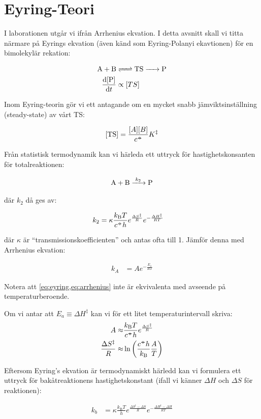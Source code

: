 \section{Eyring-Teori}
\label{sec:eyring}
I laborationen utgår vi ifrån Arrhenius ekvation. I detta avsnitt
skall vi titta närmare på Eyrings ekvation (även känd som Eyring-Polanyi ekavtionen)
för en bimolekylär rekation:

\begin{align}
  \label{eq:ts}
  \ce{A + B} & \ce{<=> TS -> P} \\
  \label{eq:dpdt-propto}
  \frac{\mathrm{d}[\ce{P}]}{\mathrm{d}t} &\propto [TS]
\end{align}

Inom Eyring-teorin gör vi ett antagande om en mycket snabb
jämviktsinställning (steady-state) av vårt TS:

\begin{equation}
  \label{eq:ts-conc}
  [\ce{TS}] = \frac{[A][B]}{c^\plimsoll}K^\ddagger
\end{equation}

Från statistisk termodynamik kan vi härleda ett uttryck för
hastighetskonsanten för totalreaktionen:

\begin{align}
  \ce{A + B ->[k_2] P}
\end{align}

där $k_2$ då ges av:

\begin{align}
  \label{eq:eyring}
  k_2 &= \kappa \frac{k_\mathrm{B} T}{c^{-\kern-5pt{\circ}\kern-5pt-} h} e^{\frac{\Delta S^\ddagger}{R}} e^{-\frac{\Delta H^\ddagger}{RT}}
\end{align}

där $\kappa$ är ``transmissionskoefficienten'' och antas ofta till 1.
Jämför denna med Arrhenius ekvation:

\begin{align}
  \label{eq:arrhenius}
  k_A &= A e^{-\frac{E_\mathrm{a}}{RT}}
\end{align}

Notera att \cref{eq:eyring,eq:arrhenius} inte är ekvivalenta med avseende
på temperaturberoende. 

Om vi antar att $E_a \equiv \Delta H^\ddagger$ kan vi för ett litet
temperaturintervall skriva:
\begin{align}
  A \approx& \frac{k_\mathrm{B} T}{c^{-\kern-5pt{\circ}\kern-5pt-} h} e^{\frac{\Delta S^\ddagger}{R}}\\
  \frac{\Delta S^\ddagger}{R} \approx& \ln\left(\frac{c^{-\kern-5pt{\circ}\kern-5pt-} h}{k_\mathrm{B}}
                                       \frac{A}{T}\right) 
\end{align}

Eftersom Eyring's ekvation är termodynamiskt härledd kan vi formulera ett
uttryck för bakåtreaktionens hastighetskonstant (ifall vi känner $\Delta H$ och $\Delta S$
för reaktionen):

\begin{align}
  k_b &= \kappa \frac{k_\mathrm{B} T}{h} e^{\frac{\Delta S^\ddagger - \Delta S}{R}}
        e^{-\frac{\Delta H^\ddagger - \Delta H}{RT}}
\end{align}

